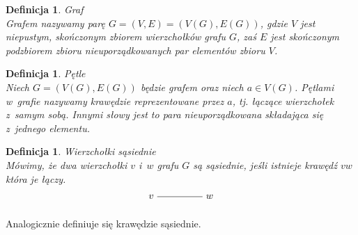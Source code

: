 \documentclass[12pt,a4paper]{report}
\newtheorem{definition}[theorem]{Definicja}
\begin{document}
\begin{definition}{Graf \cite[w oparciu o~rozdział 2]{wilson2008}}\\
Grafem nazywamy parę $G=(V,E)=(V(G),E(G))$, gdzie $V$ jest niepustym, skończonym zbiorem wierzchołków grafu $G$, zaś $E$ jest skończonym podzbiorem zbioru nieuporządkowanych par elementów zbioru $V$.
\end{definition}

\begin{definition}{Pętle \cite[Rozdział 2]{wilson2008}}\\
Niech $G=(V(G), E(G))$ będzie grafem oraz niech $a \in V(G)$. Pętlami w~grafie nazywamy krawędzie reprezentowane przez $a$, tj. łączące wierzchołek z~samym sobą. Innymi słowy jest to para nieuporządkowana składająca się z~jednego elementu.
\end{definition}


\begin{definition}{Wierzchołki sąsiednie \cite[Rozdział 2]{wilson2008}}\\
Mówimy, że dwa wierzchołki $v$ i~$w$ grafu $G$ są sąsiednie, jeśli istnieje krawędź $vw$ która je łączy. 
$$
\begin{tikzpicture}[scale=.7]
  \node (v) at (-2,0) {$v$};
  \node (w) at (1,0) {$w$};
  \draw (v)--(w); 
  
\end{tikzpicture}
$$
\end{definition}
Analogicznie definiuje się krawędzie sąsiednie.
\end{document}
